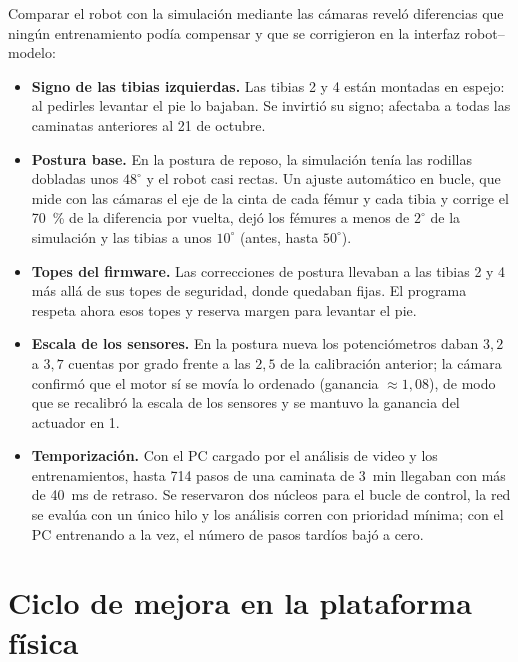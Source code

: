Comparar el robot con la simulación mediante las cámaras reveló diferencias que
ningún entrenamiento podía compensar y que se corrigieron en la interfaz
robot--modelo:
\begin{itemize}
    \item \textbf{Signo de las tibias izquierdas.} Las tibias 2 y 4 están
    montadas en espejo: al pedirles levantar el pie lo bajaban. Se invirtió su
    signo; afectaba a todas las caminatas anteriores al 21 de octubre.
    \item \textbf{Postura base.} En la postura de reposo, la simulación tenía las
    rodillas dobladas unos $48^\circ$ y el robot casi rectas. Un ajuste
    automático en bucle, que mide con las cámaras el eje de la cinta de cada
    fémur y cada tibia y corrige el 70~\% de la diferencia por vuelta, dejó los
    fémures a menos de $2^\circ$ de la simulación y las tibias a unos $10^\circ$
    (antes, hasta $50^\circ$).
    \item \textbf{Topes del firmware.} Las correcciones de postura llevaban a
    las tibias 2 y 4 más allá de sus topes de seguridad, donde quedaban fijas.
    El programa respeta ahora esos topes y reserva margen para levantar el pie.
    \item \textbf{Escala de los sensores.} En la postura nueva los
    potenciómetros daban $3{,}2$ a $3{,}7$ cuentas por grado frente a las
    $2{,}5$ de la calibración anterior; la cámara confirmó que el motor sí se
    movía lo ordenado (ganancia $\approx1{,}08$), de modo que se recalibró la
    escala de los sensores y se mantuvo la ganancia del actuador en 1.
    \item \textbf{Temporización.} Con el PC cargado por el análisis de video y
    los entrenamientos, hasta 714 pasos de una caminata de 3~min llegaban con más
    de 40~ms de retraso. Se reservaron dos núcleos para el bucle de control, la
    red se evalúa con un único hilo y los análisis corren con prioridad mínima;
    con el PC entrenando a la vez, el número de pasos tardíos bajó a cero.
\end{itemize}

\section{Ciclo de mejora en la plataforma física}

